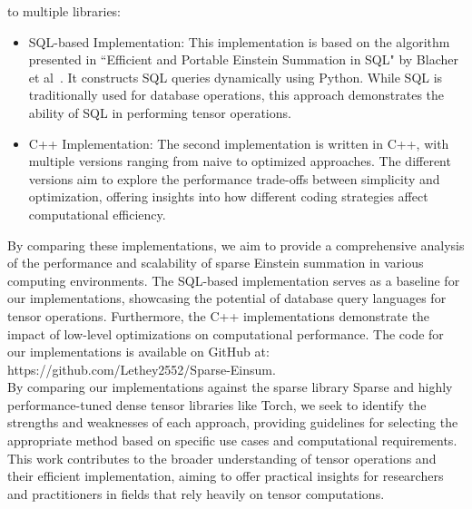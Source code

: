 to multiple libraries:
%
\begin{itemize}
      \item SQL-based Implementation:
            This implementation is based on the algorithm presented in ``Efficient and
            Portable Einstein Summation in SQL" by Blacher et al~\cite{sql_einsum}.
            It constructs SQL queries dynamically using Python. While SQL is
            traditionally used for database operations, this approach demonstrates
            the ability of SQL in performing tensor operations.
      \item C++ Implementation: The second implementation is written in C++, with multiple
            versions ranging from naive to optimized approaches. The different versions
            aim to explore the performance trade-offs between simplicity and optimization,
            offering insights into how different coding strategies affect computational
            efficiency.
\end{itemize}
%
%
By comparing these implementations, we aim to provide a comprehensive analysis of
the performance and scalability of sparse Einstein summation in various computing 
environments. The SQL-based implementation serves as a baseline for our implementations,
showcasing the potential of database query languages for tensor operations.
Furthermore, the C++ implementations demonstrate the impact of low-level optimizations
on computational performance. The code for our implementations is available on
GitHub at: https://github.com/Lethey2552/Sparse-Einsum.
\\
By comparing our implementations against the sparse library Sparse and highly
performance-tuned dense tensor libraries like Torch, we seek to identify the
strengths and weaknesses of each approach, providing guidelines for selecting the
appropriate method based on specific use cases and computational requirements.
This work contributes to the broader understanding of tensor operations and their
efficient implementation, aiming to offer practical insights for researchers and
practitioners in fields that rely heavily on tensor computations.